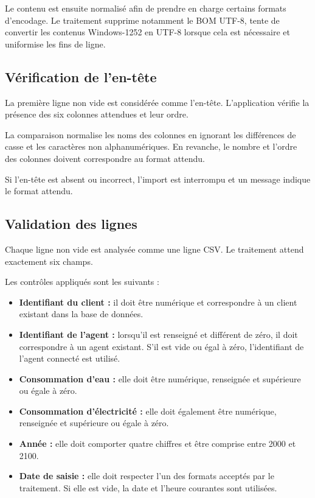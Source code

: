 Le contenu est ensuite normalisé afin de prendre en charge certains formats d'encodage. Le traitement supprime notamment le BOM UTF-8, tente de convertir les contenus Windows-1252 en UTF-8 lorsque cela est nécessaire et uniformise les fins de ligne.

\subsection{Vérification de l'en-tête}

La première ligne non vide est considérée comme l'en-tête. L'application vérifie la présence des six colonnes attendues et leur ordre.

La comparaison normalise les noms des colonnes en ignorant les différences de casse et les caractères non alphanumériques. En revanche, le nombre et l'ordre des colonnes doivent correspondre au format attendu.

Si l'en-tête est absent ou incorrect, l'import est interrompu et un message indique le format attendu.

\subsection{Validation des lignes}

Chaque ligne non vide est analysée comme une ligne CSV. Le traitement attend exactement six champs.

Les contrôles appliqués sont les suivants :

\begin{itemize}
    \item \textbf{Identifiant du client :} il doit être numérique et correspondre à un client existant dans la base de données.
    \item \textbf{Identifiant de l'agent :} lorsqu'il est renseigné et différent de zéro, il doit correspondre à un agent existant. S'il est vide ou égal à zéro, l'identifiant de l'agent connecté est utilisé.
    \item \textbf{Consommation d'eau :} elle doit être numérique, renseignée et supérieure ou égale à zéro.
    \item \textbf{Consommation d'électricité :} elle doit également être numérique, renseignée et supérieure ou égale à zéro.
    \item \textbf{Année :} elle doit comporter quatre chiffres et être comprise entre 2000 et 2100.
    \item \textbf{Date de saisie :} elle doit respecter l'un des formats acceptés par le traitement. Si elle est vide, la date et l'heure courantes sont utilisées.
\end{itemize}

